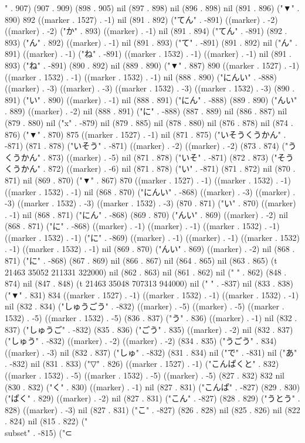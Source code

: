 " . 907) (907 . 909) (898 . 905) nil (897 . 898) nil (896 . 898) nil (891 . 896) ("▼" . 890) 892 ((marker . 1527) . -1) nil (891 . 892) ("てん" . -891) ((marker) . -2) ((marker) . -2) ("か" . 893) ((marker) . -1) nil (891 . 894) ("てん" . -891) (892 . 893) ("ん" . 892) ((marker) . -1) nil (891 . 893) ("て" . -891) (891 . 892) nil ("ん" . 891) ((marker) . -1) ("ね" . -891) ((marker . 1532) . -1) ((marker) . -1) nil (891 . 893) ("ね" . -891) (890 . 892) nil (889 . 890) ("▼" . 887) 890 ((marker . 1527) . -1) ((marker . 1532) . -1) ((marker . 1532) . -1) nil (888 . 890) ("にんい" . -888) ((marker) . -3) ((marker) . -3) ((marker . 1532) . -3) ((marker . 1532) . -3) (890 . 891) ("い" . 890) ((marker) . -1) nil (888 . 891) ("にん" . -888) (889 . 890) ("んい" . 889) ((marker) . -2) nil (888 . 891) ("に" . -888) (887 . 889) nil (886 . 887) nil (879 . 880) nil ("x" . -879) nil (879 . 885) nil (878 . 880) nil (876 . 878) nil (874 . 876) ("▼" . 870) 875 ((marker . 1527) . -1) nil (871 . 875) ("いそうくうかん" . -871) (871 . 878) ("いそう" . -871) ((marker) . -2) ((marker) . -2) (873 . 874) ("うくうかん" . 873) ((marker) . -5) nil (871 . 878) ("いそ" . -871) (872 . 873) ("そうくうかん" . 872) ((marker) . -6) nil (871 . 878) ("い" . -871) (871 . 872) nil (870 . 871) nil (869 . 870) ("▼" . 867) 870 ((marker . 1527) . -1) ((marker . 1532) . -1) ((marker . 1532) . -1) nil (868 . 870) ("にんい" . -868) ((marker) . -3) ((marker) . -3) ((marker . 1532) . -3) ((marker . 1532) . -3) (870 . 871) ("い" . 870) ((marker) . -1) nil (868 . 871) ("にん" . -868) (869 . 870) ("んい" . 869) ((marker) . -2) nil (868 . 871) ("に" . -868) ((marker) . -1) ((marker) . -1) ((marker . 1532) . -1) ((marker . 1532) . -1) ("に" . -869) ((marker) . -1) ((marker) . -1) ((marker . 1532) . -1) ((marker . 1532) . -1) nil (869 . 870) ("んい" . 869) ((marker) . -2) nil (868 . 871) ("に" . -868) (867 . 869) nil (866 . 867) nil (864 . 865) nil (863 . 865) (t 21463 35052 211331 322000) nil (862 . 863) nil (861 . 862) nil (" " . 862) (848 . 874) nil (847 . 848) (t 21463 35048 707313 944000) nil (" " . -837) nil (833 . 838) ("▼" . 831) 834 ((marker . 1527) . -1) ((marker . 1532) . -1) ((marker . 1532) . -1) nil (832 . 834) ("しゅうごう" . -832) ((marker) . -5) ((marker) . -5) ((marker . 1532) . -5) ((marker . 1532) . -5) (836 . 837) ("う" . 836) ((marker) . -1) nil (832 . 837) ("しゅうご" . -832) (835 . 836) ("ごう" . 835) ((marker) . -2) nil (832 . 837) ("しゅう" . -832) ((marker) . -2) ((marker) . -2) (834 . 835) ("うごう" . 834) ((marker) . -3) nil (832 . 837) ("しゅ" . -832) (831 . 834) nil ("で" . -831) nil ("あ" . -832) nil (831 . 833) ("▽" . 826) ((marker . 1527) . -1) ("こんぱくと" . 832) ((marker . 1532) . -5) ((marker . 1532) . -5) ((marker) . -5) (827 . 832) 832 nil (830 . 832) ("く" . 830) ((marker) . -1) nil (827 . 831) ("こんぱ" . -827) (829 . 830) ("ぱく" . 829) ((marker) . -2) nil (827 . 831) ("こん" . -827) (828 . 829) ("うとう" . 828) ((marker) . -3) nil (827 . 831) ("こ" . -827) (826 . 828) nil (825 . 826) nil (822 . 824) nil (815 . 822) ("\\subset" . -815) ("⊂

